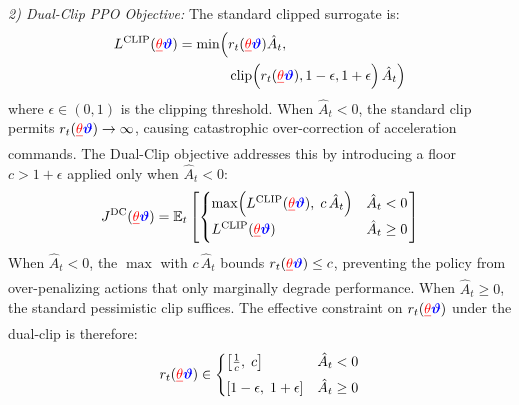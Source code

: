 \documentclass[lettersize,journal]{IEEEtran}
\newcommand{\hladd}[1]{{\color{blue}#1}}
\newcommand{\hldel}[1]{{\color{red}\sout{#1}}}
\begin{document}
\emph{2) Dual-Clip PPO Objective:} The standard clipped surrogate is:
\begin{equation}
\label{eq:standard_clip}
\begin{split}
L^{\mathrm{CLIP}}(\hldel{\theta}\hladd{\boldsymbol{\vartheta}}) = \min \Bigl( &r_t(\hldel{\theta}\hladd{\boldsymbol{\vartheta}})\hat{A}_t, \\
&\operatorname{clip}\!\left(r_t(\hldel{\theta}\hladd{\boldsymbol{\vartheta}}), 1-\epsilon, 1+\epsilon\right)\hat{A}_t \Bigr)
\end{split}
\end{equation}
where $\epsilon \in (0,1)$ is the clipping threshold. When $\hat{A}_t < 0$, the standard clip permits $r_t(\hldel{\theta}\hladd{\boldsymbol{\vartheta}}) \to \infty$, causing catastrophic over-correction of \hladd{acceleration commands}. The Dual-Clip objective addresses this by introducing a floor $c > 1+\epsilon$ applied only when $\hat{A}_t < 0$:
\begin{equation}
\label{eq:dual_clip_final}
J^{\mathrm{DC}}(\hldel{\theta}\hladd{\boldsymbol{\vartheta}}) = \mathbb{E}_{t} \left[
\begin{cases}
\max\!\left( L^{\mathrm{CLIP}}(\hldel{\theta}\hladd{\boldsymbol{\vartheta}}),\; c\,\hat{A}_t \right) & \hat{A}_t < 0 \\[4pt]
L^{\mathrm{CLIP}}(\hldel{\theta}\hladd{\boldsymbol{\vartheta}}) & \hat{A}_t \geq 0
\end{cases}
\right]
\end{equation}
When $\hat{A}_t < 0$, the $\max$ with $c\,\hat{A}_t$ bounds $r_t(\hldel{\theta}\hladd{\boldsymbol{\vartheta}}) \leq c$, preventing the policy from over-penalizing actions that only marginally degrade performance. When $\hat{A}_t \geq 0$, the standard pessimistic clip suffices. The effective constraint on $r_t(\hldel{\theta}\hladd{\boldsymbol{\vartheta}})$ under the dual-clip is therefore:
\begin{equation}
\label{eq:rt_bound}
r_t(\hldel{\theta}\hladd{\boldsymbol{\vartheta}}) \in \begin{cases} \left[\frac{1}{c},\; c\right] & \hat{A}_t < 0 \\[4pt] \left[1-\epsilon,\; 1+\epsilon\right] & \hat{A}_t \geq 0 \end{cases}
\end{equation}
\end{document}
